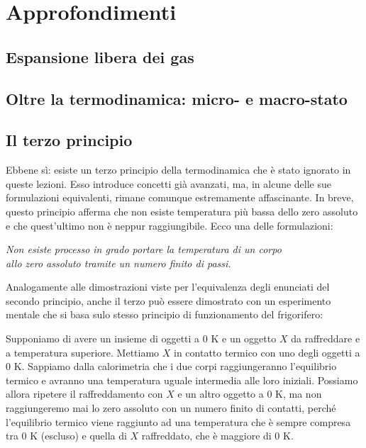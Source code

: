\section{Approfondimenti}

\subsection{Espansione libera dei gas}

\subsection{Oltre la termodinamica: micro- e macro-stato}

\subsection{Il terzo principio}
Ebbene sì: esiste un terzo principio della termodinamica che è stato
ignorato in queste lezioni. Esso introduce concetti già avanzati, ma,
in alcune delle sue formulazioni equivalenti, rimane comunque estremamente
affascinante. In breve, questo principio afferma che non esiste
temperatura più bassa dello zero assoluto e che quest'ultimo non è
neppur raggiungibile. Ecco una delle formulazioni:

\begin{center}
    \textit{Non esiste processo in grado portare la temperatura di un corpo\\allo
    zero assoluto tramite un numero finito di passi.}
\end{center}

\noindent Analogamente alle dimostrazioni viste per l'equivalenza
degli enunciati del secondo principio, anche il terzo può essere
dimostrato con un esperimento mentale che si basa sulo stesso principio
di funzionamento del frigorifero:

Supponiamo di avere un insieme di oggetti a 0 K e un oggetto $X$ da
raffreddare e a temperatura superiore. Mettiamo $X$ in
contatto termico con uno degli oggetti a 0 K. Sappiamo dalla calorimetria
che i due corpi raggiungeranno l'equilibrio termico e avranno una
temperatura uguale intermedia alle loro iniziali. Possiamo allora
ripetere il raffreddamento con $X$ e un altro oggetto a 0 K, ma
non raggiungeremo mai lo zero assoluto con un numero finito di
contatti, perché l'equilibrio termico viene raggiunto ad una temperatura
che è sempre compresa tra 0 K (escluso) e quella di $X$ raffreddato, che
è maggiore di 0 K.

